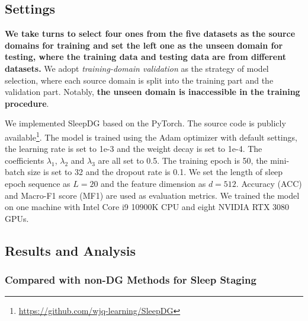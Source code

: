 \documentclass[letterpaper]{article} %
\begin{document}
	\subsection{Settings}
	\textbf{We take turns to select four ones from the five datasets as the source domains for training and set the left one as the unseen domain for testing, where the training data and testing data are from different datasets.}
	We adopt \textit{training-domain validation} \citep{wang2022generalizing} as the strategy of model selection, where each source domain is split into the training part and the validation part.
	Notably, \textbf{the unseen domain is inaccessible in the training procedure}.
	
	We implemented SleepDG based on the PyTorch.
	The source code is publicly available\footnote{\url{https://github.com/wjq-learning/SleepDG}}.
	The model is trained using the Adam optimizer with default settings, the learning rate is set to 1e-3 and the weight decay is set to 1e-4.
	The coefficients $\lambda_1$, $\lambda_2$ and $\lambda_3$ are all set to 0.5.
	The training epoch is 50, the mini-batch size is set to 32 and the dropout rate is 0.1.
	We set the length of sleep epoch sequence as $L=20$ and the feature dimension as $d=512$.
	Accuracy (ACC) and Macro-F1 score (MF1) are used as evaluation metrics.
	We trained the model on one machine with Intel Core i9 10900K CPU and eight NVIDIA RTX 3080 GPUs.
	
	\subsection{Results and Analysis}
	
	\subsubsection{Compared with non-DG Methods for Sleep Staging}
	
\end{document}
